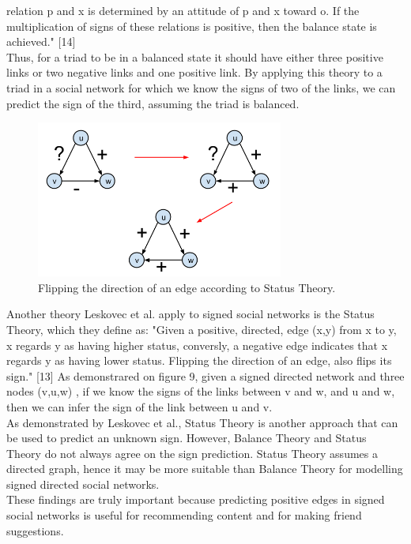 \documentclass[conference,letterpaper]{IEEEtran}
\begin{document}
relation p and x is determined by an attitude of p and x toward o. If the multiplication of signs of these
relations is positive, then the balance state is achieved." [14] \\
Thus, for a triad to be in a balanced state it should have either three positive links or two negative links
and one positive link. By applying this theory to a triad in a social network for which we know the signs of
two of the links, we can predict the sign of the third, assuming the triad is balanced.\\
\begin{center}
\begin{figure}[hb]
\centering
\includegraphics[width=3.2in]{status_theory}
\caption{
Flipping the direction of an edge according to Status Theory.
}
\label{fig_sim}
\end{figure}
\end{center}
Another theory Leskovec et al. apply to signed social networks is the Status Theory, which they define as:
"Given a positive, directed, edge (x,y) from x to y, x regards y as having higher status, conversly, a
negative edge indicates that x regards y as having lower status. Flipping the direction of an edge, also
flips its sign." [13] As demonstrared on figure 9, given a signed directed network and three nodes (v,u,w) ,
if we know the signs of the links between v and w, and u and w, then we can infer the sign of the link 
between u and v. \\
As demonstrated by Leskovec et al., Status Theory is another approach that can be used to predict an
unknown sign. However, Balance Theory and Status Theory do not always agree on the sign prediction.
Status Theory assumes a directed graph, hence it may be more suitable than Balance Theory for modelling
signed directed social networks.\\
These findings are truly important because predicting positive edges in signed social networks is useful
for recommending content and for making friend suggestions.\\
\end{document}
